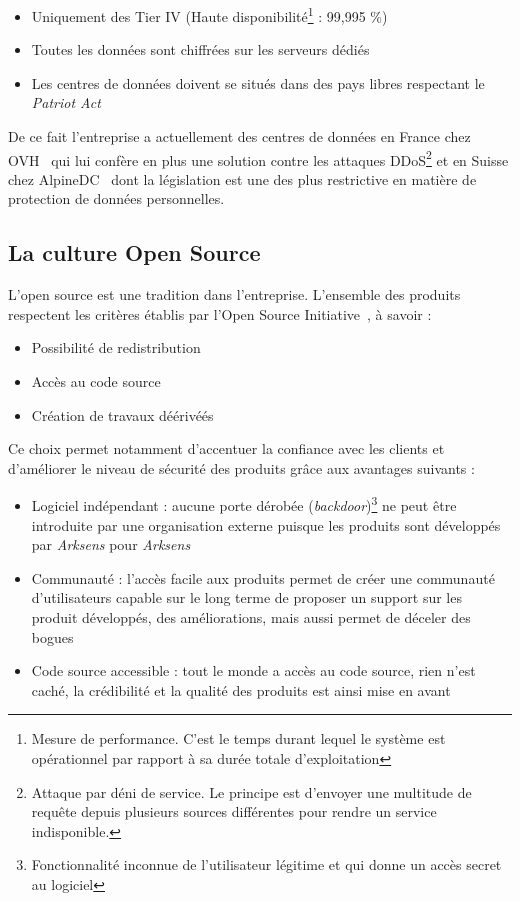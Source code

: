 \documentclass[a4paper,10pt, twoside]{report}
\begin{document}
\begin{spacing}{1.2}
\begin{itemize}
  \item Uniquement des Tier IV (Haute disponibilit\'e\footnote{Mesure de
  performance. C'est le temps durant lequel le syst\`eme est op\'erationnel par
  rapport \`a sa dur\'ee totale d'exploitation} : 99,995 \%)
  \item Toutes les données sont chiffr\'ees sur les serveurs d\'edi\'es
  \item Les centres de donn\'ees doivent se situés dans des pays libres
  respectant le \textit{Patriot Act}~\cite{refPatriotAct}
\end{itemize}

De ce fait l'entreprise a actuellement des centres de donn\'ees en France
chez OVH~\cite{refOVH} qui lui conf\`ere en plus une solution contre les
attaques DDoS\footnote{Attaque par d\'eni de service. Le principe est d'envoyer
une multitude de requ\^ete depuis plusieurs sources diff\'erentes pour rendre
un service indisponible.} et en Suisse chez AlpineDC~\cite{refAlpineDC} dont la
l\'egislation est une des plus restrictive en mati\`ere de protection de
donn\'ees personnelles.

\subsection{La culture Open Source}

L'open source est une tradition dans l'entreprise. L'ensemble des
produits respectent les crit\`eres \'etablis par l'Open Source
Initiative~\cite{refOSI}, \`a savoir :

\begin{itemize}
  \item Possibilit\'e de redistribution
  \item Accès au code source
  \item Cr\'eation de travaux d\'eériv\'eés
\end{itemize}

Ce choix permet notamment d'accentuer la confiance avec les clients et
d'am\'eliorer le niveau de s\'ecurit\'e des produits gr\^ace aux avantages
suivants :

\begin{itemize}
  \item Logiciel ind\'ependant : aucune porte d\'erob\'ee
  (\textit{backdoor})\footnote{Fonctionnalit\'e inconnue de l'utilisateur
  l\'egitime et qui donne un acc\`es secret au logiciel} ne peut
  \^etre introduite par une organisation externe puisque les produits sont
  d\'evelopp\'es par \textit{Arksens} pour \textit{Arksens}
  \item Communaut\'e : l'acc\`es facile aux produits permet de cr\'eer une
  communaut\'e d'utilisateurs capable sur le long terme de proposer un
  support sur les produit d\'evelopp\'es, des am\'eliorations, mais aussi
  permet de d\'eceler des bogues
  \item Code source accessible : tout le monde a acc\`es au code source,
  rien n'est cach\'e, la cr\'edibilit\'e et la qualit\'e des produits est ainsi
  mise en avant
\end{itemize}


\end{spacing}
\end{document}
